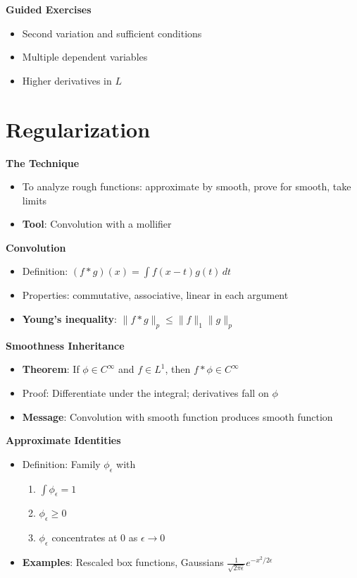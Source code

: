 \documentclass[
  10pt,
  letterpaper,
]{scrbook}
\providecommand{\tightlist}{%
  \setlength{\itemsep}{0pt}\setlength{\parskip}{0pt}}
\begin{document}
\textbf{Guided Exercises}

\begin{itemize}
\tightlist
\item
  Second variation and sufficient conditions
\item
  Multiple dependent variables
\item
  Higher derivatives in \(L\)
\end{itemize}

\section{Regularization}\label{regularization}

\textbf{The Technique}

\begin{itemize}
\tightlist
\item
  To analyze rough functions: approximate by smooth, prove for smooth,
  take limits
\item
  \textbf{Tool}: Convolution with a mollifier
\end{itemize}

\textbf{Convolution}

\begin{itemize}
\tightlist
\item
  Definition: \((f * g)(x) = \int f(x-t)g(t)\, dt\)
\item
  Properties: commutative, associative, linear in each argument
\item
  \textbf{Young's inequality}: \(\|f * g\|_p \leq \|f\|_1 \|g\|_p\)
\end{itemize}

\textbf{Smoothness Inheritance}

\begin{itemize}
\tightlist
\item
  \textbf{Theorem}: If \(\phi \in C^\infty\) and \(f \in L^1\), then
  \(f * \phi \in C^\infty\)
\item
  Proof: Differentiate under the integral; derivatives fall on \(\phi\)
\item
  \textbf{Message}: Convolution with smooth function produces smooth
  function
\end{itemize}

\textbf{Approximate Identities}

\begin{itemize}
\tightlist
\item
  Definition: Family \(\phi_\epsilon\) with

  \begin{enumerate}
  \def\labelenumi{\arabic{enumi}.}
  \tightlist
  \item
    \(\int \phi_\epsilon = 1\)
  \item
    \(\phi_\epsilon \geq 0\)
  \item
    \(\phi_\epsilon\) concentrates at 0 as \(\epsilon \to 0\)
  \end{enumerate}
\item
  \textbf{Examples}: Rescaled box functions, Gaussians
  \(\frac{1}{\sqrt{2\pi\epsilon}}e^{-x^2/2\epsilon}\)
\end{itemize}
\end{document}
